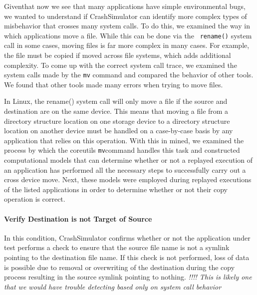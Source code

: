 Giventhat now we see that many applications have simple environmental bugs,
we wanted to understand if CrashSimulator can identify more complex types
of misbehavior that crosses many system calls.  To do this, we examined the
way in which applications move a file.  While this can be done via the {\tt
rename()} system call in some cases, moving files is far more complex in
many cases.  For example, the file must be copied if moved across file
systems, which adds additional complexity.  To come up with the correct
system call trace, we examined the system calls made by the {\tt mv}
command and compared the behavior of other tools.  We found that other
tools made many errors when trying to move files.




        In Linux, the rename() system call will only move a file if the source and destination are on the same device.
        This means that moving a file from a directory structure location on one storage device to a directory structure location on
        another device must be handled on a case-by-case basis by any application that relies on this operation.  With
        this in mined, we examined the process by which the coreutils {\tt mv}command handles this task and constructed
        computational models that can determine whether or not a replayed execution of an application has performed all
        the necessary steps to successfully carry out a cross device move.  Next, these models were employed during
        replayed executions of the listed applications in order to determine whether or not their copy operation is correct.

        \paragraph{Verify Destination is not Target of Source}

        In this condition, CrashSimulator confirms whether or not the application under test performs a check to ensure
        that the source file name is not a symlink pointing to the destination file name.  If this check is not
        performed, loss of data is possible due to removal or overwriting of the destination during the copy process
        resulting in the source symlink pointing to nothing. \emph{!!!! This is likely one that we would have trouble
          detecting based only on system call behavior}

